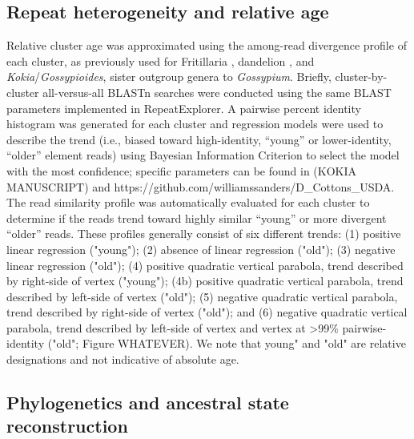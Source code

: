 \documentclass{bmcart}
\begin{document}
\subsection*{Repeat heterogeneity and relative age}
Relative cluster age was approximated using the among-read divergence profile of
each cluster, as previously used for Fritillaria \cite{Kelly2015}, dandelion
\cite{Ferreira2016}, and \textit{Kokia}/\textit{Gossypioides}, sister outgroup genera to \textit{Gossypium}. Briefly, cluster-by-cluster all-versus-all BLASTn \cite{Boratyn2013, Altshul1990} searches were conducted using the same BLAST parameters implemented in RepeatExplorer. A pairwise percent identity histogram was generated for each cluster and regression models were used to describe the trend (i.e., biased toward high-identity, “young” or lower-identity, “older” element reads) using Bayesian Information Criterion \cite{Schwarz1978} to select the model with the most confidence; specific parameters can be found in (KOKIA MANUSCRIPT) and https://github.com/williamssanders/D\_Cottons\_USDA. The read similarity profile was automatically evaluated for each cluster to determine if the reads trend toward highly similar “young” or more divergent “older” reads. These profiles generally consist of six different trends: (1) positive linear regression ("young"); (2) absence of linear
regression ("old"); (3) negative linear regression ("old"); (4) positive quadratic vertical parabola, trend described by right-side of vertex ("young"); (4b) positive quadratic vertical parabola, trend described by left-side of vertex ("old"); (5) negative quadratic vertical parabola, trend described by right-side of vertex ("old"); and (6)
negative quadratic vertical parabola, trend described by left-side of vertex and vertex at >99\% pairwise-identity ("old"; Figure WHATEVER). We note that young" and "old" are relative designations and not indicative of absolute age. 

\subsection*{Phylogenetics and ancestral state reconstruction}



\end{document}
